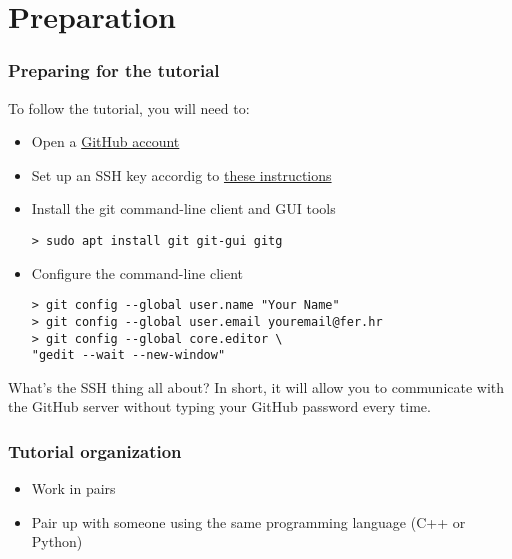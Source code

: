 \section{Preparation}

\begin{frame}[fragile]

\frametitle{Preparing for the tutorial}
	
To follow the tutorial, you will need to:
\begin{itemize}
	\item  Open a \href{https://github.com/join?source=header-home}{GitHub account}
	\item Set up an SSH key accordig to \href{https://help.github.com/articles/adding-a-new-ssh-key-to-your-github-account/}{these instructions}
	\item Install the git command-line client and GUI tools
	\begin{verbatim}
> sudo apt install git git-gui gitg
	\end{verbatim}
	\item Configure the command-line client
	\begin{verbatim}
> git config --global user.name "Your Name"
> git config --global user.email youremail@fer.hr
> git config --global core.editor \
"gedit --wait --new-window"
	\end{verbatim}
\end{itemize}
	
\begin{block}{What's the SSH thing all about?}
	In short, it will allow you to communicate with the GitHub server without typing your GitHub password every time.
\end{block}

\end{frame}


\begin{frame}

\frametitle{Tutorial organization}
	
\begin{itemize}
	\item Work in pairs
	\item Pair up with someone using the same programming language (C++ or Python)
\end{itemize}
	
\end{frame}

